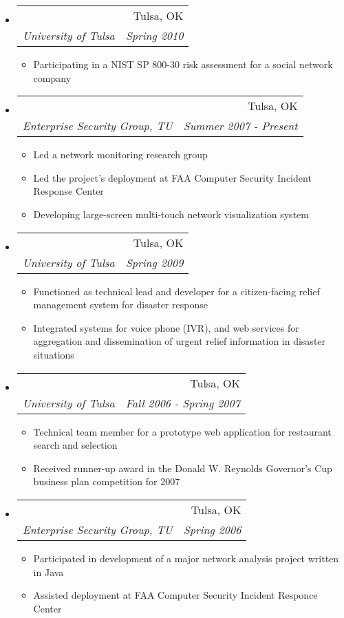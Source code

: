 \documentclass[letterpaper,11pt]{article}
\makeatletter
\newcommand{\resitem}[1]{\item #1 \vspace{-2pt}}
\newcommand{\ressubheading}[4]{
\begin{tabular*}{6.5in}{l@{\extracolsep{\fill}}r}
		\textbf{\parbox{5in}{\raggedright #1 }} & #2 \\
		\textit{#3} & \textit{#4} \\
\end{tabular*}\vspace{-6pt}}
\makeatother
\begin{document}
\begin{itemize}
\item
	\ressubheading{CogTogs Risk Assessment}{Tulsa, OK}{University of Tulsa}{Spring 2010}
	\begin{itemize}
		\resitem{Participating in a NIST SP 800-30 risk assessment for a social network company}
	\end{itemize}
\item
	\ressubheading{SAND/DVNE}{Tulsa, OK}{Enterprise Security Group, TU}{Summer 2007 - Present}
	\begin{itemize}
		\resitem{Led a network monitoring research group}
		\resitem{Led the project's deployment at FAA Computer Security Incident Response Center}
		\resitem{Developing large-screen multi-touch network visualization system}
	\end{itemize}
\item
	\ressubheading{Disastro}{Tulsa, OK}{University of Tulsa}{Spring 2009}
	\begin{itemize}
		\resitem{Functioned as technical lead and developer for a citizen-facing relief management system for disaster response}
		\resitem{Integrated systems for voice phone (IVR), and web services for aggregation and dissemination of urgent relief information in disaster situations}
	\end{itemize}
\item
	\ressubheading{Lunchman}{Tulsa, OK}{University of Tulsa}{Fall 2006 - Spring 2007}
	\begin{itemize}
		\resitem{Technical team member for a prototype web application for restaurant search and selection}
		\resitem{Received runner-up award in the Donald W. Reynolds Governor's Cup business plan competition for 2007}
	\end{itemize}
\item
	\ressubheading{NOVA}{Tulsa, OK}{Enterprise Security Group, TU}{Spring 2006}
	\begin{itemize}
		\resitem{Participated in development of a major network analysis project written in Java}
		\resitem{Assisted deployment at FAA Computer Security Incident Responce Center}
	\end{itemize}
\end{itemize}
\end{document}
